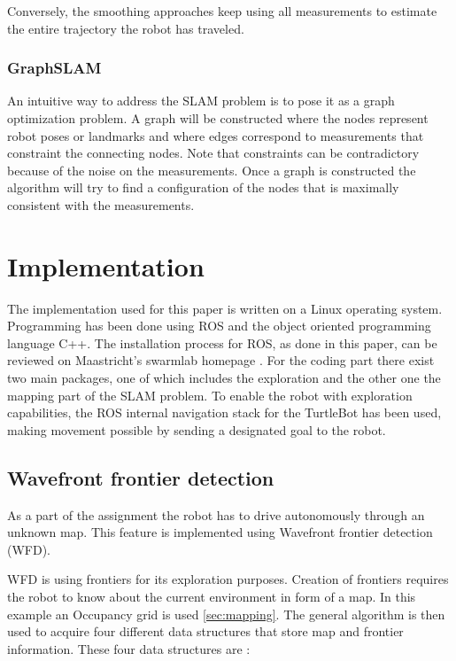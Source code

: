 \documentclass{ba-kecs}
\begin{document}
Conversely, the smoothing approaches keep using all measurements to estimate the entire trajectory the robot has traveled.

\subsubsection{GraphSLAM}
An intuitive way to address the SLAM problem is to pose it as a graph optimization problem. A graph will be constructed where the nodes represent robot poses or landmarks and where edges correspond to measurements that constraint the connecting nodes. Note that constraints can be contradictory because of the noise on the measurements. Once a graph is constructed the algorithm will try to find a configuration of the nodes that is maximally consistent with the measurements.

\section{Implementation}
\label{sec:impl}

The implementation used for this paper is written on a Linux operating system. Programming has been done using ROS and the object oriented programming language C++. The installation process for ROS, as done in this paper, can be reviewed on Maastricht's swarmlab homepage \cite{swarmlab}.
 For the coding part there exist two main packages, one of which includes the exploration and the other one the mapping part of the SLAM problem. To enable the robot with exploration capabilities, the ROS internal navigation stack for the TurtleBot has been used, making movement possible by sending a designated goal to the robot.

\subsection{Wavefront frontier detection}

As a part of the assignment the robot has to drive autonomously through an unknown map. This feature is implemented using Wavefront frontier detection (WFD).

WFD is using frontiers for its exploration purposes. Creation of frontiers requires the robot to know about the current environment in form of a map. In this example an Occupancy grid is used \ref{sec:mapping}. The general algorithm is then used to acquire four different data structures that store map and frontier information. These four data structures are :
\end{document}
